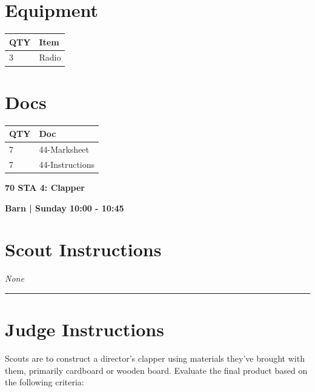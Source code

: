 \documentclass[10pt]{article}
\newcommand{\newtitle}[1]{\begin{center}{\Huge\bfseries #1 }\\ \vspace{5mm}\end{center}}
\newcommand{\newsubtitle}[1]{\begin{center}{\color{grey}\Large\bfseries #1 }\\ \vspace{5mm}\end{center}}
\begin{document}
	\begin{multicols}{2}

		\section*{\faWrench \: Equipment}

		
	\begin{center}
			\begin{tabular}{p{2cm}p{4cm}}


				\textbf{QTY} & \textbf{Item} \\\toprule
												3&Radio\\\midrule
								\end{tabular}

			\end{center}

		
		\vfill\null
		\columnbreak

			\section*{\faFile \: Docs}
		 	\begin{center}
			\begin{tabular}{p{2cm}p{4cm}}

			\textbf{QTY} & \textbf{Doc} \\\toprule
										7&44-Marksheet\\\midrule
										7&44-Instructions\\\midrule
							\end{tabular}
			\end{center}
	

		\vfill\null

		\end{multicols}



	\vspace{1cm}


	\clearpage
		\newtitle{70 STA 4: Clapper }
	\newsubtitle{Barn | Sunday 10:00 - 10:45}
		\setcounter{section}{69}
	\section*{Scout Instructions}
		\textit{None}
	
	\vspace{0.5cm}
	\hrule
	\vspace{0.5cm}

		\section*{Judge Instructions}
		Scouts are to construct a director's clapper using materials they've brought with them, primarily cardboard or wooden board. Evaluate the final product based on the following criteria:
\end{document}
